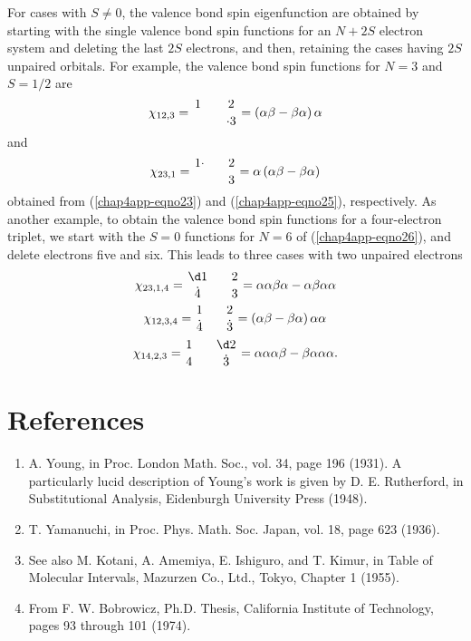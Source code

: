 For cases with $S \not= 0$, the valence bond spin eigenfunction are 
obtained by starting with the single valence bond spin functions for 
an $N + 2S$ electron system and deleting the last $2S$ electrons, and then, 
retaining the cases having $2S$ unpaired orbitals.  For example, the valence 
bond spin functions for $N=3$ and $S= 1/2$ are
\begin{equation}
\chi_{12,3} = {1 \atop ~~} ~~~~~ {2 \atop {\cdot 3}} = \left( 
\alpha \beta - \beta \alpha \right) \alpha
\end{equation}
and
\begin{equation}
\chi_{23,1} = {{1\cdot} \atop ~~} {~~~~~} {2 \atop 3} = 
\alpha \left( \alpha \beta - \beta \alpha \right)
\end{equation}
obtained from (\ref{chap4app-eqno23}) and (\ref{chap4app-eqno25}),
respectively.  As another example, to obtain the valence bond spin
functions for a four-electron triplet, we start with the $S = 0$
functions for $N = 6$ of (\ref{chap4app-eqno26}), and delete electrons
five and six.  This leads to three cases with two unpaired electrons
\begin{equation}
\chi_{23,1,4} = {{\d 1} \atop {\dot 4}} {~~~~~} {2 \atop 3} = \alpha 
\alpha \beta \alpha - \alpha \beta \alpha \alpha
\end{equation}
\begin{equation}
\chi_{12,3,4} = {1 \atop {\dot 4}} {~~~~~} {2 \atop {\dot 3}} = \left( 
\alpha \beta - \beta \alpha \right) \alpha \alpha
\end{equation}
\begin{equation}
\chi_{14,2,3} = {1 \atop 4} {~~~~~} {{\d 2} \atop {\dot 3}} = \alpha \alpha 
\alpha \beta - \beta \alpha \alpha \alpha .
\end{equation}

\section{References}
\begin{enumerate}
\item A. Young, in Proc. London Math. Soc., vol. 34, page 196 
(1931).  A particularly lucid description of Young's work is given by 
D. E. Rutherford, in Substitutional Analysis, Eidenburgh University 
Press (1948).

\item T. Yamanuchi, in Proc. Phys. Math. Soc. Japan, vol. 18, 
page 623 (1936).

\item See also M. Kotani, A. Amemiya, E. Ishiguro, and T. Kimur, 
in Table of Molecular Intervals, Mazurzen Co., Ltd., Tokyo, Chapter 
1 (1955).

\item From F. W. Bobrowicz, Ph.D. Thesis, California Institute 
of Technology, pages 93 through 101 (1974).
\end{enumerate}
